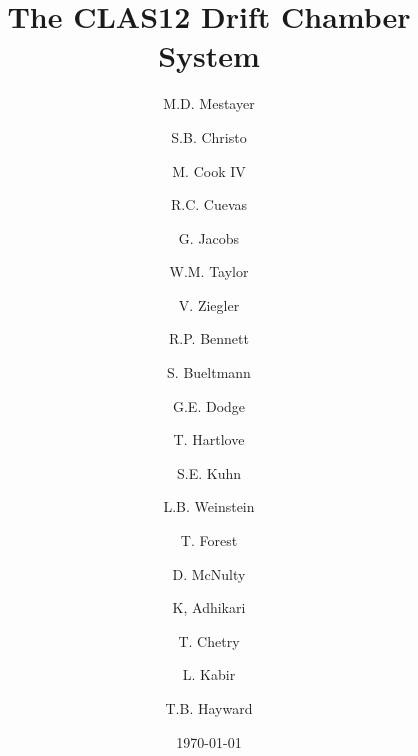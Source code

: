 \documentclass{elsart}
\begin{document}
\begin{frontmatter}
  
\title{The CLAS12 Drift Chamber System}


\author[jlab]{M.D. Mestayer}
\author[jlab]{S.B. Christo}
\author[jlab]{M. Cook IV}
\author[jlab]{R.C. Cuevas}
\author[jlab]{G. Jacobs}
\author[jlab]{W.M. Taylor}
\author[jlab]{V. Ziegler}
\author[odu]{R.P. Bennett}
\author[odu]{S. Bueltmann}
\author[odu]{G.E. Dodge}
\author[odu]{T. Hartlove}
\author[odu]{S.E. Kuhn}
\author[odu]{L.B. Weinstein}
\author[isu]{T. Forest}
\author[isu]{D. McNulty}
\author[msu]{K, Adhikari}
\author[msu]{T. Chetry}
\author[msu]{L. Kabir}
\author[wm]{T.B. Hayward}
\address[jlab]{Thomas Jefferson National Accelerator Facility, Newport News, VA 23606, USA}
\address[odu]{Old Dominion University}
\address[isu]{Idaho State University}
\address[msu]{Mississippi State University}
\address[wm]{University of William and Mary}

\date{\today}





\end{frontmatter}













\end{document}

